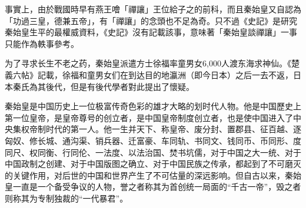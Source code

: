 事實上，由於戰國時早有燕王噲「禪讓」王位給子之的前科，而且秦始皇又自認為「功過三皇，德兼五帝」，有「禪讓」的念頭也不足為奇。只不過《史記》是研究秦始皇生平的最權威資料，《史記》沒有記載該事，意味著「秦始皇談禪讓」一事只能作為軼事參考。

为了寻求长生不老之药，秦始皇派遣方士徐福率童男女6,000人渡东海求神仙。《楚義六帖》記載，徐福和童男女们在到达目的地瀛洲（即今日本）之后一去不返，日本秦氏為其後代，但是有後代學者對此提出了懷疑。

秦始皇是中国历史上一位极富传奇色彩的雄才大略的划时代人物。他是中国歷史上第一位皇帝，是皇帝尊号的创立者，是中国皇帝制度创立者，也是使中国进入了中央集权帝制时代的第一人。他一生并天下、称皇帝、废分封、置郡县、征百越、逐匈奴、修长城、通沟渠、销兵器、迁富豪、车同轨、书同文、钱同币、币同形、度同尺、权同衡、行同伦、一法度、以法治国、焚书坑儒，对于中国之大一统、对于中国政制之创建、对于中国版图之确立、对于中国民族之传承，都起到了不可磨灭的关键作用，对后世的中国和世界产生了不可估量的深远影响。但自古以来，秦始皇一直是一个备受争议的人物，誉之者称其为首创统一局面的“千古一帝”，毁之者则称其为专制独裁的“一代暴君”。



